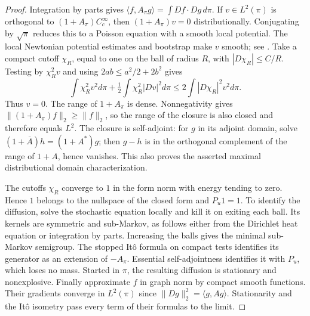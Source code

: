 \begin{proof}
Integration by parts gives
$\langle f,A_\pi g\rangle=\int Df\cdot Dg\,d\pi$.
If $v\in L^2(\pi)$ is orthogonal to
$(1+A_\pi)C_c^\infty$, then $(1+A_\pi)v=0$
distributionally.  Conjugating by $\sqrt\pi$ reduces this to a
Poisson equation with a smooth local potential.  The local Newtonian
potential estimates and bootstrap make $v$ smooth; see
\cite[Lecture~24, p.~2; Lecture~16, p.~2]{Viaclovsky2004}. Take a compact cutoff $\chi_R$, equal to one on the ball
of radius $R$, with $|D\chi_R|\le C/R$. Testing by
$\chi_R^2v$ and using $2ab\le a^2/2+2b^2$ gives
\[
 \int\chi_R^2v^2d\pi+\tfrac12\int\chi_R^2|Dv|^2d\pi
 \le2\int|D\chi_R|^2v^2d\pi.
\]
Thus $v=0$. The range of $1+A_\pi$ is dense. Nonnegativity
gives $\|(1+A_\pi)f\|_2\ge\|f\|_2$, so the range of the
closure is also closed and therefore equals $L^2$. The closure is
self-adjoint: for $g$ in its adjoint domain, solve
$(1+\overline A)h=(1+A^*)g$; then $g-h$ is in the orthogonal
complement of the range of $1+A$, hence vanishes. This also proves
the asserted maximal distributional domain characterization.

The cutoffs $\chi_R$ converge to $1$ in the form norm with energy
tending to zero. Hence $1$ belongs to the nullspace of the closed
form and $P_u1=1$. To identify the diffusion, solve the stochastic
equation locally and kill it on exiting each ball. Its kernels are
symmetric and sub-Markov, as follows either from the Dirichlet
heat equation or integration by parts. Increasing the balls gives
the minimal sub-Markov semigroup. The stopped It\^o formula on
compact tests identifies its generator as an extension of $-A_\pi$.
Essential self-adjointness identifies it with $P_u$, which loses
no mass. Started in $\pi$, the resulting diffusion is stationary
and nonexplosive. Finally approximate $f$ in graph norm by compact
smooth functions. Their gradients converge in $L^2(\pi)$ since
$\|Dg\|_2^2=\langle g,Ag\rangle$. Stationarity and the
It\^o isometry pass every term of their formulas to the limit.
\end{proof}

